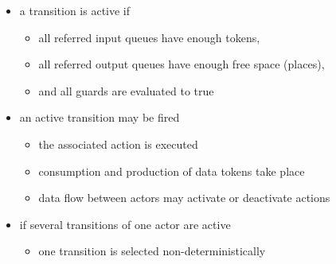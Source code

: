 \begin{frame}[t]
\begin{itemize}
\item a transition is active if 
\begin{itemize}
\item all referred input queues have enough tokens,
\item all referred output queues have enough free space (places),
\item and all guards are evaluated to true
\end{itemize}
\item an active transition may be fired
\begin{itemize}
\item the associated action is executed
\item consumption and production of data tokens take place
\item data flow between actors may activate or deactivate actions
\end{itemize}
\item if several transitions of one actor are active
\begin{itemize}
\item one transition is selected non-deterministically
\end{itemize}
\end{itemize}
\end{frame}


